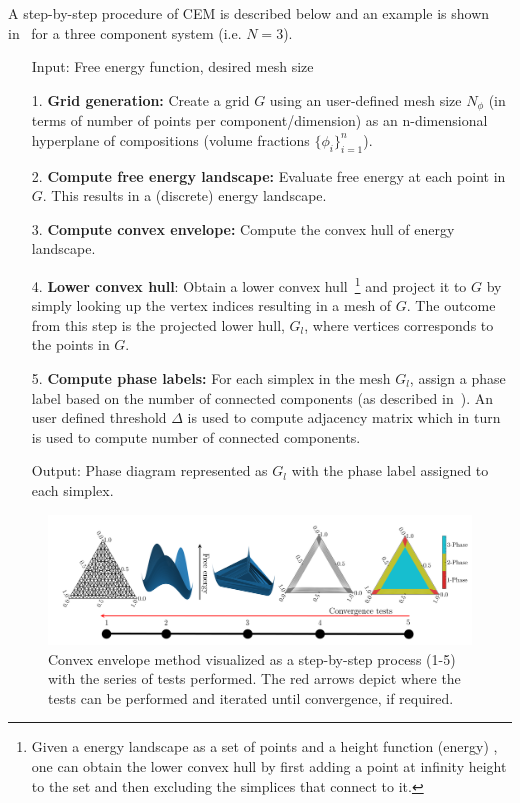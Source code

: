 A step-by-step procedure of CEM is described below and an example is shown in~ for a three component system (i.e. \(N=3\)).
\begin{enumerate}\label{algo:cem}
    \item[Input:] Free energy function, desired mesh size
    \item[1.] \textbf{Grid generation:} Create a grid \(G\) using an user-defined mesh size $N_{\phi}$ (in terms of number of points per component/dimension) as an n-dimensional hyperplane of compositions (volume fractions \(\{\phi_i\}_{i=1}^{n}\)).
    \item[2.] \textbf{Compute free energy landscape:} Evaluate free energy at each point in \(G\). This results in a (discrete) energy landscape. 
    \item[3.] \textbf{Compute convex envelope:} Compute the convex hull of energy landscape. 
    \item[4.] \textbf{Lower convex hull}: Obtain a lower convex hull~\footnote{Given a energy landscape as a set of points and a height function (energy) , one can obtain the lower convex hull by first adding a point at infinity height to the set and then excluding the simplices that connect to it.} and project it to \(G\) by simply looking up the vertex indices resulting in a mesh of \(G\). 
    The outcome from this step is the projected lower hull, \(G_l\), where vertices corresponds to the points in \(G\).
    \item[5.] \textbf{Compute phase labels:} For each simplex in the mesh $G_l$, assign a phase label based on the number of connected components (as described in~\cite{SoftMatterCEM}). 
    An user defined threshold \(\Delta\) is used to compute adjacency matrix which in turn is used to compute number of connected components.
    \item[Output:] Phase diagram represented as $G_l$ with the phase label assigned to each simplex. 
\end{enumerate}

\begin{figure}[h]
    \centering
    \includegraphics[width=\textwidth]{Chapter-4/figures/CEM_workflow.png}
    \caption{Convex envelope method visualized as a step-by-step process (1-5) with the series of tests performed. The red arrows depict where the tests can be performed and iterated until convergence, if required.}
    \label{fig:workflow}
\end{figure}


